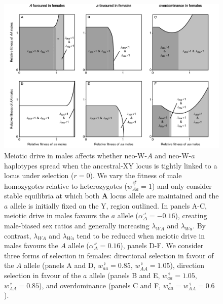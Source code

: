 \documentclass[12pt]{article}
\begin{document}
\begin{figure}[!h]
\centering
\centerline{\includegraphics[width=\linewidth]{Region_Plot_combined_MaleDrive}}
\caption{
Meiotic drive in males affects whether neo-W-$A$ and neo-W-$a$ haplotypes spread when the ancestral-XY locus is tightly linked to a locus under selection ($r=0$). 
We vary the fitness of male homozygotes relative to heterozygotes ($w_{Aa}^\Hermaphrodite=1$) and only consider stable equilibria at which both \textbf{A} locus allele are maintained and the $a$ allele is initially fixed on the Y, region outlined. 
In panels A-C, meiotic drive in males favours the $a$ allele ($\alpha_{\Delta}^\male=-0.16$), creating male-biased sex ratios and generally increasing $\lambda_{WA}$ and $\lambda_{Wa}$. 
By contrast, $\lambda_{WA}$ and $\lambda_{Wa}$ tend to be reduced when meiotic drive in males favours the $A$ allele ($\alpha_{\Delta}^\male=0.16$), panels D-F. 
We consider three forms of selection in females: directional selection in favour of the $A$ allele (panels A and D, $w_{aa}^\female=0.85$, $w_{AA}^\female=1.05$), direction selection in favour of the $a$ allele (panels B and E, $w_{aa}^\female=1.05$, $w_{AA}^\female=0.85$), and overdominance (panels C and F, $w_{aa}^\female=w_{AA}^\female=0.6$).
}
\label{fig:regionMaleDrive}
\end{figure}
\end{document}
